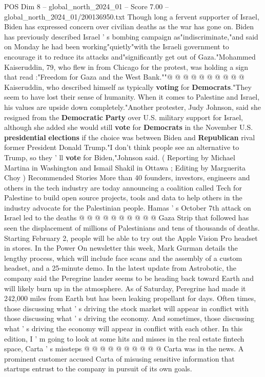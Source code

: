 \begin{textsample}{POS Dim 8 – global\_north\_2024\_01 – Score 7.00 – global\_north\_2024\_01/200136950.txt}
Though long a fervent supporter of Israel, Biden has expressed concern over civilian deaths as the war has gone on.
Biden has previously described Israel ' s bombing campaign as"indiscriminate,"and said on Monday he had been working"quietly"with the Israeli government to encourage it to reduce its attacks and"significantly get out of Gaza."Mohammed Kaiseruddin, 79, who flew in from Chicago for the protest, was holding a sign that read :"Freedom for Gaza and the West Bank.""@ @ @ @ @ @ @ @ @ @ Kaiseruddin, who described himself as typically \textbf{voting} for \textbf{Democrats}."They seem to have lost their sense of humanity.
When it comes to Palestine and Israel, his values are upside down completely."Another protester, Judy Johnson, said she resigned from the \textbf{Democratic} \textbf{Party} over U.S. military support for Israel, although she added she would still \textbf{vote} for \textbf{Democrats} in the November U.S. \textbf{presidential} \textbf{elections} if the choice was between Biden and \textbf{Republican} rival former President Donald Trump."I don't think people see an alternative to Trump, so they ' ll \textbf{vote} for Biden,"Johnson said. ( Reporting by Michael Martina in Washington and Ismail Shakil in Ottawa ; Editing by Marguerita Choy ) Recommended Stories More than 40 founders, investors, engineers and others in the tech industry are today announcing a coalition called Tech for Palestine to build open source projects, tools and data to help others in the industry advocate for the Palestinian people.
Hamas ' s October 7th attack on Israel led to the deaths @ @ @ @ @ @ @ @ @ @ Gaza Strip that followed has seen the displacement of millions of Palestinians and tens of thousands of deaths.
Starting February 2, people will be able to try out the Apple Vision Pro headset in stores.
In the Power On newsletter this week, Mark Gurman details the lengthy process, which will include face scans and the assembly of a custom headset, and a 25-minute demo.
In the latest update from Astrobotic, the company said the Peregrine lander seems to be heading back toward Earth and will likely burn up in the atmosphere.
As of Saturday, Peregrine had made it 242,000 miles from Earth but has been leaking propellant for days.
Often times, those discussing what ' s driving the stock market will appear in conflict with those discussing what ' s driving the economy.
And sometimes, those discussing what ' s driving the economy will appear in conflict with each other.
In this edition, I ' m going to look at some hits and misses in the real estate fintech space, Carta ' s missteps @ @ @ @ @ @ @ @ @ @ Carta was in the news.
A prominent customer accused Carta of misusing sensitive information that startups entrust to the company in pursuit of its own goals.

\end{textsample}
